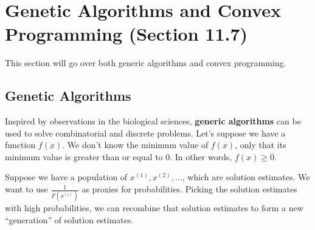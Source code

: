 \documentclass[letterpaper]{article}
\begin{document}
\section{Genetic Algorithms and Convex Programming (Section 11.7)}
This section will go over both generic algorithms and convex programming. 

\subsection{Genetic Algorithms}
Inspired by observations in the biological sciences, \textbf{generic algorithms} can be used to solve combinatorial and discrete problems. Let's suppose we have a function $f(x)$. We don't know the minimum value of $f(x)$, only that its minimum value is greater than or equal to 0. In other words, $f(x) \geq 0$.

\bigskip 

Suppose we have a population of $x^{(1)}, x^{(2)}, \hdots$, which are solution estimates. We want to use $\frac{1}{F(x^{(i)})}$ as proxies for probabilities. Picking the solution estimates with high probabilities, we can recombine that solution estimates to form a new ``generation'' of solution estimates. 
\end{document}

